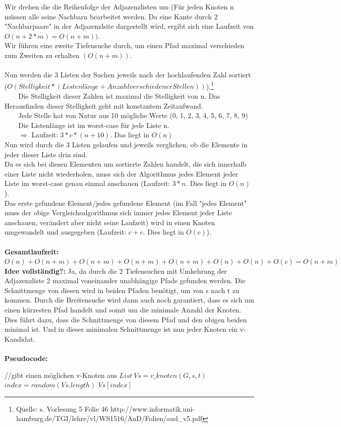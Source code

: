 \documentclass{article}
\begin{document}
Wir drehen die die Reihenfolge der Adjazenzlisten um (Für jeden Knoten n müssen alle seine Nachbarn bearbeitet werden.
Da eine Kante durch 2 "Nachbarpaare" in der Adjazenzlsite dargestellt wird, ergibt sich eine Laufzeit von $O(n + 2 * m) = O(n + m))$.\\
Wir führen eine zweite Tiefensuche durch, um einen Pfad maximal verschieden zum Zweiten zu erhalten $(O(n + m))$.\\
\\
Nun werden die 3 Listen der Suchen jeweils nach der hochlaufenden Zahl sortiert ($O(Stelligkeit * (Listenlänge + Anzahl verschiedener Stellen))$).\footnote{Quelle: s. Vorlesung 5 Folie 46 http://www.informatik.uni-hamburg.de/TGI/lehre/vl/WS1516/AuD/Folien/aud\_v5.pdf}\\
\-~~~~Die Stelligkeit dieser Zahlen ist maximal die Stelligkeit von n.
	Das Herausfinden dieser Stelligkeit geht mit konstantem Zeitaufwand.\\
\-~~~~Jede Stelle hat von Natur aus 10 mögliche Werte (0, 1, 2, 3, 4, 5, 6, 7, 8, 9)\\
\-~~~~Die Listenlänge ist im worst-case für jede Liste n.\\
\-~~~~$\Rightarrow$ Laufzeit: $3 * c * (n + 10)$. Das liegt in $O(n)$\\
Nun wird durch die 3 Listen gelaufen und jeweils verglichen, ob die Elemente in jeder dieser Liste drin sind.\\
Da es sich bei diesen Elementen um sortierte Zahlen handelt, die sich innerhalb einer Liste nicht wiederholen, muss sich der Algorithmus jedes Element jeder Liste im worst-case genau einmal anschauen (Laufzeit: $3 * n$. Dies liegt in $O(n)$).\\
Das erste gefundene Element/jedes gefundene Element (im Fall "jedes Element" muss der obige Vergleichsalgorithmus sich immer jedes Element jeder Liste anschauen, verändert aber nicht seine Laufzeit) wird in einen Knoten umgewandelt und ausgegeben (Laufzeit: $c + c$. Dies liegt in $O(c)$).\\
\\
\textbf{Gesamtlaufzeit:} $O(n) + O(n + m) + O(n + m) + O(n + m) + O(n + m) + O(n) + O(n) + O(c) = O(n + m)$\\
\textbf{Idee vollständig?:} Ja, da durch die 2 Tiefensuchen mit Umkehrung der Adjazenzliste 2 maximal voneinander unabhängige Pfade gefunden werden.
Die Schnittmenge von diesen wird in beiden Pfaden benötigt, um von s nach t zu kommen.
Durch die Breitensuche wird dann auch noch garantiert, dass es sich um einen kürzesten Pfad handelt und somit um die minimale Anzahl der Knoten.
Dies führt dazu, dass die Schnittmenge von diesem Pfad und den obigen beiden minimal ist.
Und in dieser minimalen Schnittmenge ist nun jeder Knoten ein v-Kandidat.\\
\\
\textbf{Pseudocode:}
\begin{codebox}
	\zi //gibt einen möglichen v-Knoten aus
    \li $List~Vs = v\_knoten(G, s, t)$
    \li $index = random(Vs.length)$
    \li \Return $Vs[index]$
\end{codebox}
\end{document}

